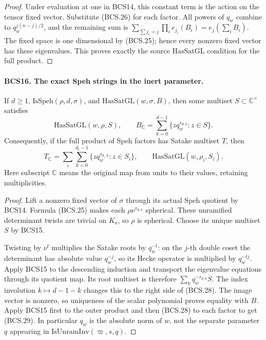 \documentclass[11pt,a4paper]{article}
\numberwithin{equation}{section}
\theoremstyle{remark}\newtheorem{remark}[theorem]{Remark}
\begin{document}
\begin{proof}
Under evaluation at one in BCS14, this constant term is the action
on the tensor fixed vector.  Substitute (BCS.26) for each factor.
All powers of \(q_w\) combine to \(q_w^{j(n-j)/2}\), and the
remaining sum is
\(\sum_{\sum j_i=j}\prod_i e_{j_i}(B_i)=e_j(\sum_iB_i)\).
The fixed space is one dimensional by (BCS.25); hence every nonzero
fixed vector has these eigenvalues.  This proves exactly the source
\(\mathrm{HasSatGL}\) condition for the full product.
\end{proof}

\paragraph{BCS16. The exact Speh strings in the inert parameter.}
\label{claim:BCS16}
If \(d\ge1\), \(\mathrm{IsSpeh}(\rho,d,\sigma)\), and
\(\mathrm{HasSatGL}(w,\sigma,B)\), then some multiset
\(S\subset\mathbb C^\times\) satisfies
\[
 \mathrm{HasSatGL}(w,\rho,S),\qquad
 B_{\mathbb C}=\sum_{k=0}^{d-1}
                       \{zq_w^{s_{d,k}}:z\in S\}.
 \tag{BCS.28}
\]
Consequently, if the full product of Speh factors has Satake multiset
\(T\), then
\[
             T_{\mathbb C}=\sum_i\sum_{k=0}^{d_i-1}
                       \{zq_w^{s_{d_i,k}}:z\in S_i\},
 \qquad\mathrm{HasSatGL}(w,\rho_i,S_i).
 \tag{BCS.29}
\]
Here subscript \(\mathbb C\) means the original map from units
to their values, retaining multiplicities.
\begin{proof}
Lift a nonzero fixed vector of \(\sigma\) through its actual
Speh quotient by BCS14.  Formula (BCS.25) makes each
\(\rho\nu^{s_{d,k}}\) spherical.  These unramified determinant
twists are trivial on \(K_a\), so \(\rho\) is spherical.
Choose its unique multiset \(S\) by BCS15.

Twisting by \(\nu^t\) multiplies the Satake roots by
\(q_w^{-t}\): on the \(j\)-th double coset the determinant has
absolute value \(q_w^{-j}\), so its Hecke operator is multiplied
by \(q_w^{-tj}\).  Apply BCS15 to the descending induction and
transport the eigenvalue equations through its quotient map.  Its
root multiset is therefore \(\sum_k q_w^{-s_{d,k}}S\).
The index involution \(k\mapsto d-1-k\) changes this to the right
side of (BCS.28).  The image vector is nonzero, so uniqueness of the
scalar polynomial proves equality with \(B\).  Apply BCS15 first
to the outer product and then (BCS.28) to each factor to get
(BCS.29).  In particular \(q_w\) is the absolute norm of \(w\),
not the separate parameter \(q\) appearing in
\(\mathrm{IsUnramInv}(\varpi,s,q)\).
\end{proof}
\end{document}
